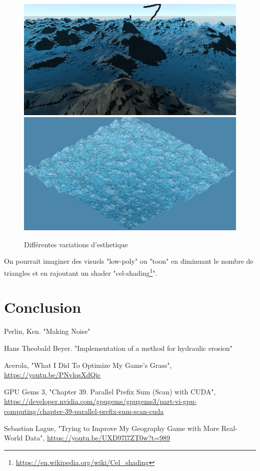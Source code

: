 \documentclass{EPUProjetDi}
\begin{document}
\begin{figure}[ht]
	\centering
	\includegraphics[scale=.205]{esthetics_1}
	\includegraphics[scale=.2]{esthetics_2}
	\caption{Différentes variations d'esthetique}
	\label{fig:esthetics}
\end{figure}

On pourrait imaginer des visuels "low-poly" ou "toon" en diminuant le nombre de triangles et en rajoutant un shader "cel-shading\footnote{\url{https://en.wikipedia.org/wiki/Cel_shading}}".

\chapter*{Conclusion}





\begin{thebibliography}{9}
Perlin, Ken. "Making Noise"

Hans Theobald Beyer. "Implementation of a method for hydraulic erosion"

Acerola, "What I Did To Optimize My Game's Grass", \url{https://youtu.be/PNvlqsXdQic}

GPU Gems 3, "Chapter 39. Parallel Prefix Sum (Scan) with CUDA", \url{https://developer.nvidia.com/gpugems/gpugems3/part-vi-gpu-computing/chapter-39-parallel-prefix-sum-scan-cuda}

Sebastian Lague, "Trying to Improve My Geography Game with More Real-World Data", \url{https://youtu.be/UXD97l7ZT0w?t=989}
\end{thebibliography}




\makedernierepage
\end{document}
